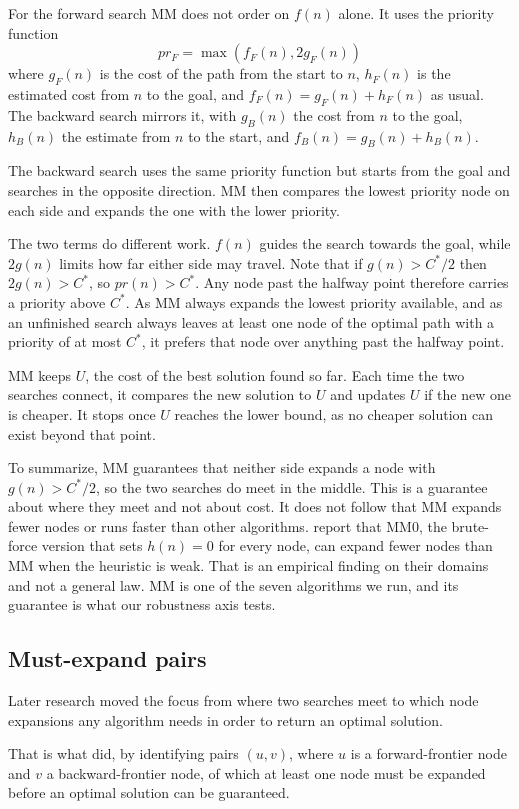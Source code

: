 \documentclass[letterpaper]{article} %
\begin{document}
For the forward search MM does not order on $f(n)$ alone. It uses the priority function \[pr_F = \max(f_F(n), 2g_F(n))\] where $g_F(n)$ is the cost of the path from the start to $n$, $h_F(n)$ is the estimated cost from $n$ to the goal, and $f_F(n) = g_F(n) + h_F(n)$ as usual. The backward search mirrors it, with $g_B(n)$ the cost from $n$ to the goal, $h_B(n)$ the estimate from $n$ to the start, and $f_B(n) = g_B(n) + h_B(n)$.

The backward search uses the same priority function but starts from the goal and searches in the opposite direction. MM then compares the lowest priority node on each side and expands the one with the lower priority.

The two terms do different work. $f(n)$ guides the search towards the goal, while $2g(n)$ limits how far either side may travel. Note that if $g(n) > C^*/2$ then $2g(n) > C^*$, so $pr(n) > C^*$. Any node past the halfway point therefore carries a priority above $C^*$. As MM always expands the lowest priority available, and as an unfinished search always leaves at least one node of the optimal path with a priority of at most $C^*$, it prefers that node over anything past the halfway point.

MM keeps $U$, the cost of the best solution found so far. Each time the two searches connect, it compares the new solution to $U$ and updates $U$ if the new one is cheaper. It stops once $U$ reaches the lower bound, as no cheaper solution can exist beyond that point.

To summarize, MM guarantees that neither side expands a node with $g(n) > C^*/2$, so the two searches do meet in the middle. This is a guarantee about where they meet and not about cost. It does not follow that MM expands fewer nodes or runs faster than other algorithms. \citet{holte2017mm} report that MM0, the brute-force version that sets $h(n) = 0$ for every node, can expand fewer nodes than MM when the heuristic is weak. That is an empirical finding on their domains and not a general law. MM is one of the seven algorithms we run, and its guarantee is what our robustness axis tests.

\subsection{Must-expand pairs}
Later research moved the focus from where two searches meet to which node expansions any algorithm needs in order to return an optimal solution.

That is what \citet{eckerle2017sufficient} did, by identifying pairs $(u,v)$, where $u$ is a forward-frontier node and $v$ a backward-frontier node, of which at least one node must be expanded before an optimal solution can be guaranteed.
\end{document}
